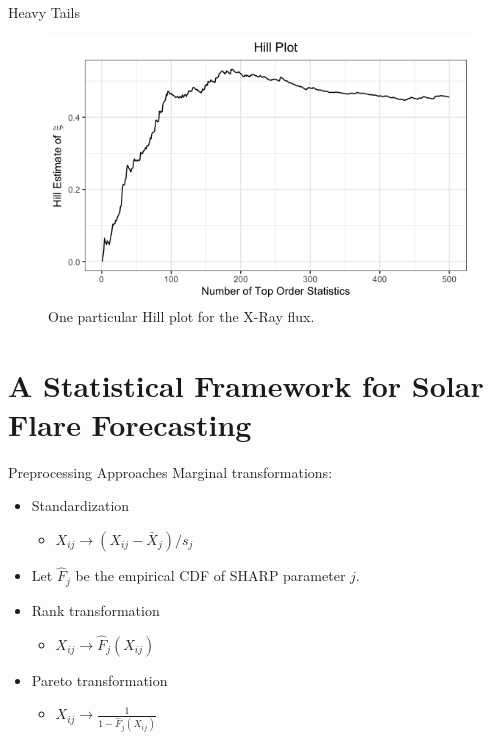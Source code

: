 \documentclass{beamer}
\begin{document}
\begin{frame}{Heavy Tails}
    \begin{figure}
        \centering
        \includegraphics[scale=0.5]{hill_plot.png}
        \caption{One particular Hill plot for the X-Ray flux.}
        \label{fig:hill_plot}
    \end{figure}
\end{frame}


\section{A Statistical Framework for Solar Flare Forecasting}
\label{sect:forecast_framework}

\begin{frame}{Preprocessing Approaches}
    Marginal transformations:
    \begin{itemize}
        \item Standardization
        \begin{itemize}
            \item $X_{i j} \rightarrow (X_{i j} - \bar{X}_j) / s_j$
        \end{itemize}
        \item Let $\hat{F}_j$ be the empirical CDF of SHARP parameter $j$.
        \item Rank transformation
        \begin{itemize}
            \item $X_{i j} \rightarrow \hat{F}_j(X_{i j})$
        \end{itemize}
        \item Pareto transformation
        \begin{itemize}
            \item $X_{i j} \rightarrow \frac{1}{1 - \hat{F}_j(X_{i j})}$
        \end{itemize}
    \end{itemize}
\end{frame}
\end{document}
